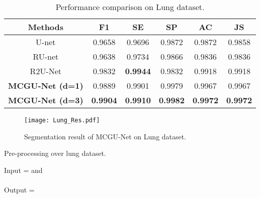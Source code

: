 \documentclass[journal]{IEEEtran}
\begin{document}
 
 
 









\begin{table}
\centering
    \vspace*{-\baselineskip}
\caption{Performance comparison on Lung dataset.}
	\begin{tabular}{cccccc}
		\hline
		\textbf{Methods} & \textbf{F1}&	\textbf{SE}&	\textbf{SP}&	\textbf{AC}&	\textbf{JS}\\
		\hline
		U-net  \cite{ronneberger2015} & 0.9658 & 0.9696&0.9872&	0.9872&		0.9858 \\
		RU-net  \cite{alom2018} &0.9638&	 0.9734&	0.9866&	0.9836&		0.9836 \\
		R2U-Net \cite{alom2018} &0.9832&	\textbf{0.9944}&	0.9832&	0.9918&		0.9918 \\
\hline
\textbf{MCGU-Net (d=1)}& 0.9889& 0.9901&0.9979&	0.9967&0.9967\\
		\textbf{MCGU-Net (d=3)}& \textbf{0.9904} & \textbf{0.9910}& \textbf{0.9982}& \textbf{0.9972}&  \textbf{0.9972}\\
		\hline
	\end{tabular}
	\label{tab:lung}
\end{table}

\begin{figure}
	\centering
	\texttt{[image: Lung\_Res.pdf]}
	\caption{Segmentation result of MCGU-Net on Lung dataset.} 
	\vspace*{-0.5\baselineskip}
	\label{fig:Lung_R}
\end{figure}

 
\begin{algorithm}
	\caption{Pre-processing over lung dataset.}
	\label{Alg:1}
	\begin{algorithmic}[1]
		\STATE Input =  and \\
		\\
		
		\STATE Output = 
		\STATE  \\
		\\
		\STATE 
		\STATE 
		\STATE 
		\STATE 
		\STATE 
	\end{algorithmic}
\end{algorithm}
\end{document}
